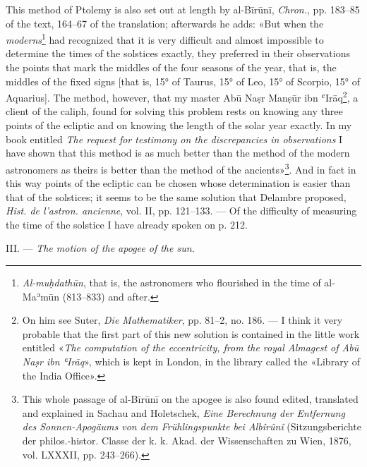 \documentclass[11pt]{article}
\newcommand{\Pg}[1]{\marginpar{\footnotesize\color{gray}#1}}
\begin{document}
\par This method of Ptolemy is also set out at length by al-Bīrūnī, \emph{Chron.}, pp. 183–85 of the text, 164–67 of the translation; afterwards he adds: «But when the \emph{moderns}\footnote{\emph{Al-muḥdathūn}, that is, the astronomers who flourished in the time of al-Maʾmūn (813–833) and after.} had recognized that it is very difficult and almost impossible to determine the times of the solstices exactly, they preferred in their observations the points that mark the middles of the four seasons of the year, that is, the middles of the fixed signs [that is, 15° of Taurus, 15° of Leo, 15° of Scorpio, 15° of Aquarius]. The method, however, that my master Abū Naṣr Manṣūr ibn ʿIrāq\footnote{On him see Suter, \emph{Die Mathematiker}, pp. 81–2, no. 186. — I think it very probable that the first part of this new solution is contained in the little work entitled «\emph{The computation of the eccentricity, from the royal Almagest of Abū Naṣr ibn ʿIrāq}», which is kept in London, in the library called the «Library of the India Office».}, a client of the caliph, found for solving this problem rests on knowing any three points of the ecliptic and on knowing the length of the solar year exactly. In my book entitled \emph{The request for testimony on the discrepancies in observations} I have shown that this method is as much better than the method of the modern astronomers as theirs is better than the method of the ancients»\footnote{This whole passage of al-Bīrūnī on the apogee is also found edited, translated and explained in Sachau and Holetschek, \emph{Eine Berechnung der Entfernung des Sonnen-Apogäums von dem Frühlingspunkte bei Albîrûnî} (Sitzungsberichte der philos.-histor. Classe der k. k. Akad. der Wissenschaften zu Wien, 1876, vol. LXXXII, pp. 243–266).}. And in fact in this way points of the ecliptic can be chosen whose determination is easier than that of the solstices; it seems to be the same solution that Delambre proposed, \emph{Hist. de l’astron. ancienne}, vol. II, pp. 121–133. — Of the difficulty of measuring the time of the solstice I have already spoken on p. 212.\par
\par \Pg{I 216}III. — \emph{The motion of the apogee of the sun.}\par
\end{document}
